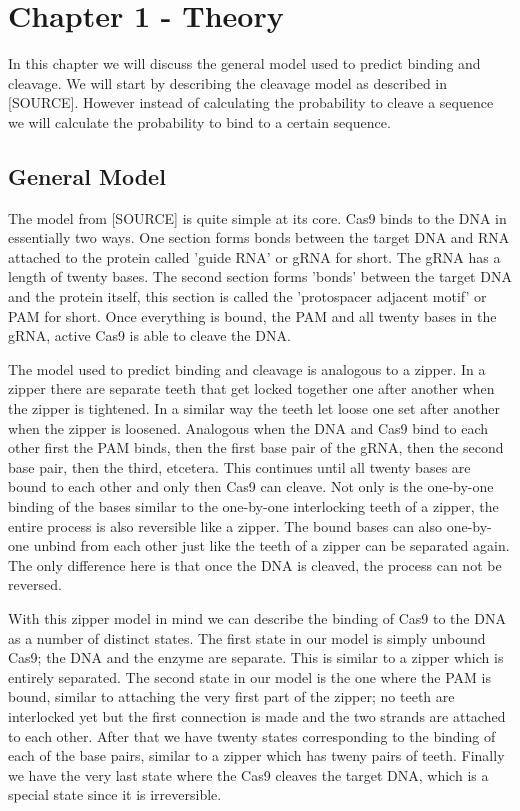 \chapter{Chapter 1 - Theory}

In this chapter we will discuss the general model used to predict binding and cleavage. We will start by describing the cleavage model as described in [SOURCE]. However instead of calculating the probability to cleave a sequence we will calculate the probability to bind to a certain sequence.

\section{General Model}

The model from [SOURCE] is quite simple at its core. Cas9 binds to the DNA in essentially two ways. One section forms bonds between the target DNA and RNA attached to the protein called 'guide RNA' or gRNA for short. The gRNA has a length of twenty bases. The second section forms 'bonds' between the target DNA and the protein itself, this section is called the 'protospacer adjacent motif' or PAM for short. Once everything is bound, the PAM and all twenty bases in the gRNA, active Cas9 is able to cleave the DNA.


The model used to predict binding and cleavage is analogous to a zipper. In a zipper there are separate teeth that get locked together one after another when the zipper is tightened. In a similar way the teeth let loose one set after another when the zipper is loosened. Analogous when the DNA and Cas9 bind to each other first the PAM binds, then the first base pair of the gRNA, then the second base pair, then the third, etcetera. This continues until all twenty bases are bound to each other and only then Cas9 can cleave. Not only is the one-by-one binding of the bases similar to the one-by-one interlocking teeth of a zipper, the entire process is also reversible like a zipper. The bound bases can also one-by-one unbind from each other just like the teeth of a zipper can be separated again. The only difference here is that once the DNA is cleaved, the process can not be reversed.

With this zipper model in mind we can describe the binding of Cas9 to the DNA as a number of distinct states. The first state in our model is simply unbound Cas9; the DNA and the enzyme are separate. This is similar to a zipper which is entirely separated. The second state in our model is the one where the PAM is bound, similar to attaching the very first part of the zipper; no teeth are interlocked yet but the first connection is made and the two strands are attached to each other. After that we have twenty states corresponding to the binding of each of the base pairs, similar to a zipper which has tweny pairs of teeth. Finally we have the very last state where the Cas9 cleaves the target DNA, which is a special state since it is irreversible.

